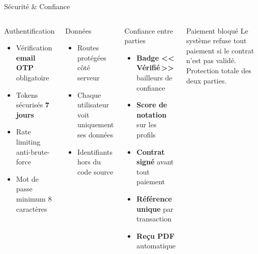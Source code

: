 ﻿\documentclass[aspectratio=169,10pt]{beamer}
\newcommand{\kcbold}[1]{\textcolor{kcCoral}{\textbf{#1}}}
\begin{document}
\begin{frame}{S\'{e}curit\'{e} \& Confiance}
\begin{columns}[T]
\begin{block}{Authentification}
\begin{itemize}
\item V\'{e}rification \textbf{email OTP} obligatoire
\item Tokens s\'{e}curis\'{e}s \textbf{7 jours}
\item Rate limiting anti-brute-force
\item Mot de passe minimum 8 caract\`{e}res
\end{itemize}
\end{block}
\vspace{0.2cm}
\begin{block}{Donn\'{e}es}
\begin{itemize}
\item Routes prot\'{e}g\'{e}es c\^{o}t\'{e} serveur
\item Chaque utilisateur voit uniquement ses donn\'{e}es
\item Identifiants hors du code source
\end{itemize}
\end{block}
\begin{alertblock}{Confiance entre parties}
\begin{itemize}
\item \kcbold{Badge <<\,V\'{e}rifi\'{e}\,>>} bailleurs de confiance
\item \kcbold{Score de notation} sur les profils
\item \kcbold{Contrat sign\'{e}} avant tout paiement
\item \kcbold{R\'{e}f\'{e}rence unique} par transaction
\item \kcbold{Re\c{c}u PDF} automatique
\end{itemize}
\end{alertblock}
\vspace{0.2cm}
\begin{block}{Paiement bloqu\'{e}}
Le syst\`{e}me refuse tout paiement si le contrat n'est pas valid\'{e}. Protection totale des deux parties.
\end{block}
\end{columns}
\end{frame}
\end{document}
